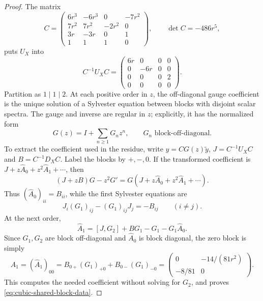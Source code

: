 \begin{proof}
The matrix
\[
 C=\begin{pmatrix}
 6r^3&-6r^3&0&-7r^2\\7r^2&7r^2&-2r^2&0\\
 3r&-3r&0&1\\1&1&1&0
 \end{pmatrix},
 \qquad \det C=-486r^5,
\]
puts \(U_X\) into
\[
 C^{-1}U_XC=
 \begin{pmatrix}6r&0&0&0\\0&-6r&0&0\\0&0&0&2\\0&0&0&0\end{pmatrix}.
\]
Partition as \(1\mid1\mid2\).  At each positive order in \(z\), the
off-diagonal gauge coefficient is the unique solution of a Sylvester
equation between blocks with disjoint scalar spectra.  The gauge and inverse
are regular in \(z\); explicitly, it has the normalized form
\begin{equation}
 G(z)=I+\sum_{n\ge1}G_nz^n,
 \qquad G_n\text{ block-off-diagonal}.
 \label{eq:cubic-integral-block-gauge}
\end{equation}
To extract the coefficient used in the residue, write
\(y=CG(z)\widetilde y\), \(J=C^{-1}U_XC\) and \(B=C^{-1}D_XC\).
Label the blocks by \(+,-,0\).  If the transformed coefficient is
\(J+z\widehat A_0+z^2\widehat A_1+\cdots\), then
\[
 (J+zB)G-z^2G'=G(J+z\widehat A_0+z^2\widehat A_1+\cdots).
\]
Thus \((\widehat A_0)_{ii}=B_{ii}\), while the first Sylvester equations are
\[
 J_i(G_1)_{ij}-(G_1)_{ij}J_j=-B_{ij}\qquad(i\ne j).
\]
At the next order,
\[
 \widehat A_1=[J,G_2]+BG_1-G_1-G_1\widehat A_0.
\]
Since \(G_1,G_2\) are block off-diagonal and \(\widehat A_0\) is block
diagonal, the zero block is simply
\[
 A_1=(\widehat A_1)_{00}
 =B_{0+}(G_1)_{+0}+B_{0-}(G_1)_{-0}
 =\begin{pmatrix}0&-14/(81r^2)\\-8/81&0\end{pmatrix}.
\]
This computes the needed coefficient without solving for \(G_2\), and proves
\eqref{eq:cubic-shared-block-data}.
\end{proof}


